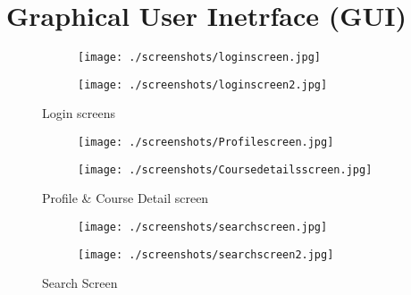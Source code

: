 \section{Graphical User Inetrface (GUI)}

\begin{figure}[!h]
    \centering
    \begin{subfigure}{.5\textwidth}
      \centering
      \texttt{[image: ./screenshots/loginscreen.jpg]}
      \label{fig:sub1}
    \end{subfigure}%
    \begin{subfigure}{.5\textwidth}
      \centering
      \texttt{[image: ./screenshots/loginscreen2.jpg]}
      \label{fig:sub2}
    \end{subfigure}
    \caption{Login screens}
    \label{fig:test}
    \end{figure}

    \begin{figure}
        \centering
        \begin{subfigure}{.5\textwidth}
          \centering
          \texttt{[image: ./screenshots/Profilescreen.jpg]}
          \label{fig:sub1}
        \end{subfigure}%
        \begin{subfigure}{.5\textwidth}
          \centering
          \texttt{[image: ./screenshots/Coursedetailsscreen.jpg]}
          \label{fig:sub2}
        \end{subfigure}
        \caption{Profile \& Course Detail screen}
        \label{fig:test}
        \end{figure}

    \begin{figure}
        \centering
        \begin{subfigure}{.5\textwidth}
          \centering
          \texttt{[image: ./screenshots/searchscreen.jpg]}
          \label{fig:sub1}
        \end{subfigure}%
        \begin{subfigure}{.5\textwidth}
          \centering
          \texttt{[image: ./screenshots/searchscreen2.jpg]}
          \label{fig:sub2}
        \end{subfigure}
        \caption{Search Screen}
        \label{fig:test}
        \end{figure}


